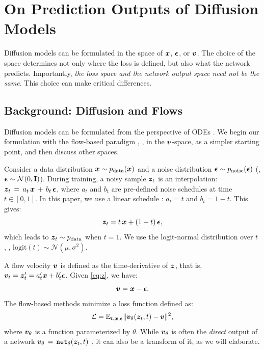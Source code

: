 \section{On Prediction Outputs of Diffusion Models}
\label{sec:analysis}

Diffusion models can be formulated in the space of $\bm{x}$, $\bm{\epsilon}$, or $\bm{v}$. The choice of the space determines not only where the loss is defined, but also what the network predicts.
Importantly, \textit{the loss space and the network output space need not be the same}. This choice can make critical differences.

\subsection{Background: Diffusion and Flows}

Diffusion models can be formulated from the perspective of ODEs \cite{chen2018neural,Song2021,lipman2022flow, song2020denoising}. We begin our formulation with the flow-based paradigm \cite{lipman2022flow,liu2022flow,albergo2023building}, \ie, in the $\bm{v}$-space, as a simpler starting point, and then discuss other spaces.

Consider a data distribution $\bm{x} \sim p_\text{data}(\bm{x})$ and a noise distribution $\bm{\epsilon} \sim p_\text{noise}(\bm{\epsilon})$ (\eg, $\bm{\epsilon}\sim\mathcal{N}(0,\mathbf{I})$). During training, a noisy sample $\bm{z}_t$ is an interpolation: $\bm{z}_t\,=\,a_t\,\bm{x}\,+\,b_t\,\bm{\epsilon}$,
where $a_t$ and $b_t$ are pre-defined noise schedules at time $t \in [0, 1]$. In this paper, we use a linear schedule \cite{lipman2022flow,liu2022flow,albergo2023building}\footnotemark: $a_t = t$ and $b_t = 1 - t$. This gives:
\begin{equation}
\bm{z}_t = t \, \bm{x} + (1 - t)\, \bm{\epsilon} \label{eq:z},
\end{equation}
which leads to $\bm{z}_t\sim p_\text{data}$ when $t{=}1$.
We use the logit-normal distribution over $t$ \cite{esser2024scaling}, \ie, $\text{logit}(t) \sim \mathcal{N}(\mu,\sigma^2)$.


A flow velocity $\bm{v}$ is defined as the time-derivative of $\bm{z}$, that is, $\bm{v}_t = \bm{z}_t' = a'_t \bm{x} + b'_t \bm{\epsilon}$. Given \cref{eq:z}, we have:
\begin{equation}
\bm{v} = \bm{x} - \bm{\epsilon}.
\label{eq:v}
\end{equation}
The flow-based methods \cite{lipman2022flow,liu2022flow,albergo2023building} minimize a loss function defined as:
\begin{equation}
\mathcal{L} = \mathbb{E}_{t,\bm{x},\bm{\epsilon}} \|  \bm{v}_\theta(\bm{z}_t, t) - \bm{v} \|^2,
\label{eq:loss_v}
\end{equation}
where $\bm{v}_\theta$ is a function parameterized by $\theta$. While $\bm{v}_\theta$ is often the \textit{direct} output of a network $\bm{v}_\theta\,=\,\text{\texttt{net}}_\theta(\bm{z}_t, t)$ \cite{lipman2022flow,liu2022flow,albergo2023building}, it can also be a transform of it, as we will elaborate.

